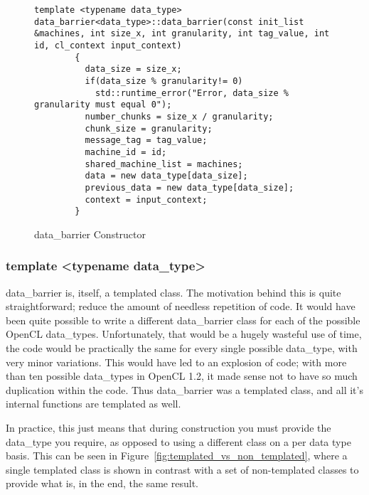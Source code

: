 \documentclass[../thesis.tex]{subfiles}
\begin{document}
  \begin{figure}[htbp]
    \centering

    \lstset{language=cpp}  
    \begin{lstlisting}[tabsize=2]
        template <typename data_type> data_barrier<data_type>::data_barrier(const init_list &machines, int size_x, int granularity, int tag_value, int id, cl_context input_context)
        {
          data_size = size_x;
          if(data_size % granularity!= 0)
            std::runtime_error("Error, data_size % granularity must equal 0");
          number_chunks = size_x / granularity;
          chunk_size = granularity;
          message_tag = tag_value;
          machine_id = id;
          shared_machine_list = machines;
          data = new data_type[data_size];
          previous_data = new data_type[data_size];
          context = input_context;
        }

      \end{lstlisting}

    \caption{data\_barrier Constructor}
    \label{fig:data_barrier_constructor}
  \end{figure}
   

  \subsubsection{template <typename data\_type>} %
  \label{ssub:template_typename_data_type}
    data\_barrier is, itself, a templated class. The motivation behind this is quite straightforward; reduce the amount of needless repetition of code. It would have been quite possible to write a different data\_barrier class for each of the possible OpenCL data\_types. Unfortunately, that would be a hugely wasteful use of time, the code would be practically the same for every single possible data\_type, with very minor variations. This would have led to an explosion of code; with more than ten possible data\_types \cite{opencldatatypes} in OpenCL 1.2, it made sense not to have so much duplication within the code. Thus data\_barrier was a templated class, and all it's internal functions are templated as well.

    In practice, this just means that during construction you must provide the data\_type you require, as opposed to using a different class on a per data type basis. This can be seen in Figure~\ref{fig:templated_vs_non_templated}, where a single templated class is shown in contrast with a set of non-templated classes to provide what is, in the end, the same result.
\end{document}

